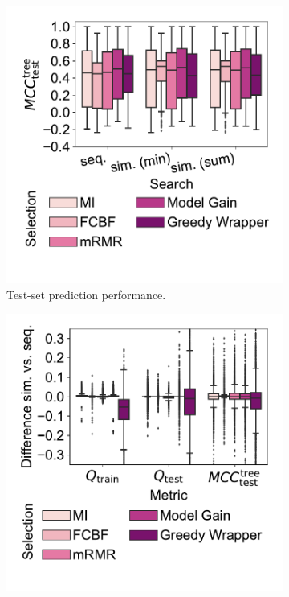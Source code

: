 \documentclass{article}
\theoremstyle{definition}
\begin{document}
\begin{figure}[t]
	\centering
	\begin{subfigure}[t]{0.48\textwidth}
		\centering
		\includegraphics[width=\textwidth, trim=15 40 15 10, clip]{plots/afs-impact-search-fs-method-decision-tree-test-mcc.pdf}
		\caption{Test-set prediction performance.}
		\label{fig:afs:impact-search-fs-method-decision-tree-test-mcc}
	\end{subfigure}
	\hfill
	\begin{subfigure}[t]{0.48\textwidth}
		\centering
		\includegraphics[width=\textwidth, trim=15 40 15 10, clip]{plots/afs-impact-search-fs-method-metric-diff.pdf}

\end{subfigure}
\end{figure}
\end{document}
